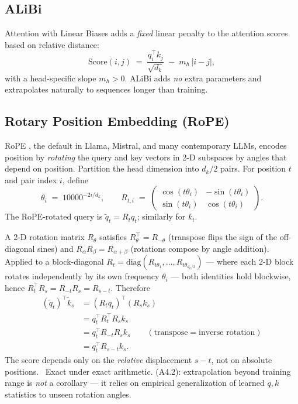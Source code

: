 \subsection{ALiBi}

Attention with Linear Biases \citep{press2022alibi} adds a
\emph{fixed} linear penalty to the attention scores based on relative
distance:
\begin{equation}
\label{eq:ch5-alibi}
\mathrm{Score}(i, j) \;=\; \frac{q_i^{\top} k_j}{\sqrt{d_k}}
  \;-\; m_h\,|i - j|,
\end{equation}
with a head-specific slope $m_h > 0$. ALiBi adds \emph{no} extra
parameters and extrapolates naturally to sequences longer than
training.

\subsection{Rotary Position Embedding (RoPE)}

RoPE \citep{su2021rope}, the default in Llama, Mistral, and many
contemporary LLMs, encodes position by \emph{rotating} the query and
key vectors in 2-D subspaces by angles that depend on position.
Partition the head dimension into $d_k / 2$ pairs. For position $t$
and pair index $i$, define
\begin{equation}
\theta_i \;=\; 10000^{-2i/d_k},
\qquad
R_{t, i} \;=\; \begin{pmatrix}
\cos(t\theta_i) & -\sin(t\theta_i) \\
\sin(t\theta_i) &  \cos(t\theta_i)
\end{pmatrix}.
\end{equation}
The RoPE-rotated query is $\tilde q_t = R_t q_t$; similarly for $k_t$.

\begin{derivation}
A 2-D rotation matrix $R_\theta$ satisfies
$R_\theta^{\top} = R_{-\theta}$ (transpose flips the sign of the
off-diagonal sines) and $R_\alpha R_\beta = R_{\alpha+\beta}$
(rotations compose by angle addition). Applied to a block-diagonal
$R_t = \mathrm{diag}(R_{t\theta_1}, \dots, R_{t\theta_{d_k/2}})$ ---
where each 2-D block rotates independently by its own frequency
$\theta_i$ --- both identities hold blockwise, hence
$R_t^{\top} R_s = R_{-t} R_s = R_{s-t}$. Therefore
\begin{align}
(\tilde q_t)^{\top} \tilde k_s
&= (R_t q_t)^{\top} (R_s k_s) \\
&= q_t^{\top} R_t^{\top} R_s k_s \\
&= q_t^{\top} R_{-t} R_s k_s
  \qquad (\text{transpose} = \text{inverse rotation}) \\
&= q_t^{\top} R_{s-t} k_s.
\label{eq:ch5-rope-relative}
\end{align}
The score depends only on the \emph{relative} displacement
$s - t$, not on absolute positions. \Ident\ Exact under exact
arithmetic. (A4.2): extrapolation beyond training range is
\emph{not} a corollary --- it relies on empirical generalization of
learned $q, k$ statistics to unseen rotation angles.
\end{derivation}

